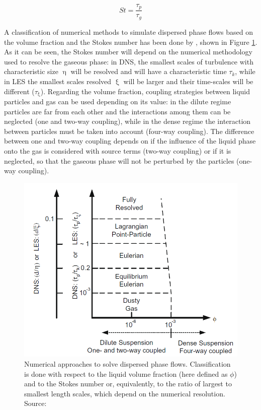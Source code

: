 \begin{equation}
\label{eq:Stokes_number_definition_general}
St = \frac{\tau_p}{\tau_g}
\end{equation}

A classification of numerical methods to simulate dispersed phase flows based on the volume fraction and the Stokes number has been done by , shown in Figure \ref{fig:balachandar_numerical_methods_representation}. As it can be seen, the Stokes number will depend on the numerical methodology used to resolve the gaseous phase: in DNS, the smallest scales of turbulence with characteristic size $\upeta$ will be resolved and will have a characteristic time $\tau_k$, while in LES the smallest scales resolved $\upxi$ will be larger and their time-scales will be different ($\tau_\upxi$). Regarding the volume fraction, coupling strategies between liquid particles and gas can be used depending on its value: in the dilute regime particles are far from each other and the interactions among them can be neglected (one and two-way coupling), while in the dense regime the interaction between particles must be taken into account (four-way coupling). The difference between one and two-way coupling depends on if the influence of the liquid phase onto the gas is considered with source terms (two-way coupling) or if it is neglected, so that the gaseous phase will not be perturbed by the particles (one-way coupling).


\begin{figure}[h!]
	\centering
	\includegraphics[scale=0.6]{./part1_numerical_approaches/figures_ch3/balachandar_disperse_phase_classification}
	\caption[Numerical approaches to solve dispersed phase flows]{Numerical approaches to solve dispersed phase flows. Classification is done with respect to the liquid volume fraction (here defined as $\phi$) and to the Stokes number or, equivalently, to the ratio of largest to smallest length scales, which depend on the numerical resolution.  Source: }
	\label{fig:balachandar_numerical_methods_representation}
\end{figure}

